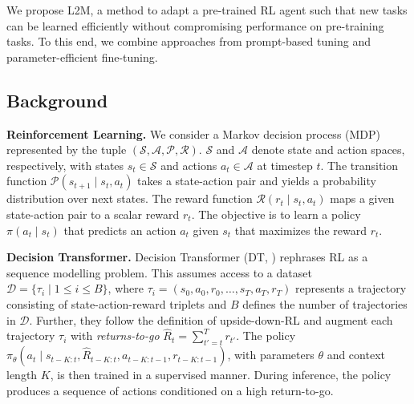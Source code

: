 \documentclass{article}
\begin{document}
We propose L2M, a method to adapt a pre-trained RL agent such that new tasks can be learned efficiently without compromising performance on pre-training tasks.
To this end, we combine approaches from prompt-based tuning and parameter-efficient fine-tuning.

\subsection{Background} 

\textbf{Reinforcement Learning.} We consider a Markov decision process (MDP) represented by the tuple  $(\mathcal{S},\mathcal{A},\mathcal{P},\mathcal{R})$. 
$\mathcal{S}$ and $\mathcal{A}$ denote state and action spaces, respectively, with states $s_t \in \mathcal{S}$ and actions $a_t \in \mathcal{A}$ at timestep $t$. 
The transition function $\mathcal{P}(s_{t+1}\mid s_t, a_t)$ takes a state-action pair and yields a probability distribution over next states. 
The reward function $\mathcal{R}(r_t \mid s_t, a_t)$ maps a given state-action pair to a scalar reward $r_t$.
The objective is to learn a policy $\pi(a_t\mid s_t)$ that predicts an action $a_t$ given $s_t$ that maximizes the reward $r_t$.


\textbf{Decision Transformer.} Decision Transformer (DT, \citealp{Chen:21}) rephrases RL as a sequence modelling problem.
This assumes access to a dataset $\mathcal{D}=\{\tau_i \mid 1 \leq i \leq B \}$, where $\tau_i=(s_0, a_0, r_0, \ldots, s_T, a_T, r_T)$ represents a trajectory consisting of state-action-reward triplets and $B$ defines the number of trajectories in $\mathcal{D}$. 
Further, they follow the definition of upside-down-RL \citep{Schmidhuber:19} and augment each trajectory $\tau_i$ with \emph{returns-to-go} $\hat R_t=\sum_{t'=t}^T r_{t'}$.
The policy $\pi_{\theta} (a_t \mid s_{t-K: t}, \hat R_{t-K:t}, a_{t-K:t-1}, r_{t-K:t-1})$, with parameters $\theta$ and context length $K$, is then trained in a supervised manner.
During inference, the policy produces a sequence of actions conditioned on a high return-to-go.
\end{document}

